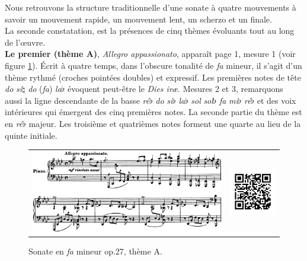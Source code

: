 Nous retrouvons la structure traditionnelle d'une sonate à quatre mouvements à savoir un mouvement rapide, un mouvement lent, un scherzo et un finale.\\

La seconde constatation, est la présences de cinq thèmes évoluants tout au long de l'œuvre.\\

\textbf{Le premier (thème A)}, \emph{Allegro appassionato}, apparaît page 1, mesure 1 (voir figure \ref{sonate-theme-1}). Écrit à quatre temps, dans l'obscure tonalité de \emph{fa} mineur, il s'agit d'un thème rythmé (croches pointées doubles) et expressif. Les premières notes de tête \emph{do} \emph{si}$\natural$ \emph{do} (\emph{fa}) \emph{la}$\flat$ évoquent peut-être le \emph{Dies iræ}. Mesures 2 et 3, remarquons aussi la ligne descendante de la basse \emph{ré}$\flat$ \emph{do} \emph{si}$\flat$ \emph{la}$\flat$ \emph{sol} \emph{sol}$\flat$ \emph{fa} \emph{mi}$\flat$ \emph{ré}$\flat$ et des voix intérieures qui émergent des cinq premières notes. La seconde partie du thème est en \emph{ré}$\flat$ majeur. Les troisième et quatrièmes notes forment une quarte au lieu de la quinte initiale.

\begin{figure}[!ht]
  \begin{bigcenter}
    \vspace*{0.2cm}
    \begin{tabular}{lr}
      \includegraphics[width=12.5cm, keepaspectratio]{sonate-theme-A.png}
      &
      \includegraphics[width=3cm, keepaspectratio]{op1-qr.png}
    \end{tabular}
  \end{bigcenter}
  \caption{\label{sonate-theme-1}Sonate en \emph{fa} mineur op.27, thème A.}
\end{figure}

